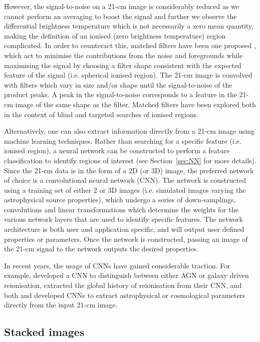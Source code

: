 However, the signal-to-noise on a 21-cm image is considerably reduced as we cannot perform an averaging to boost the signal and further we observe the differential brightness temperature which is not necessarily a zero mean quantity, making the definition of an ionised (zero brightness temperature) region complicated. In order to counteract this, matched filters have been one proposed \cite{Datta:2007,Datta:2008,Datta:2012,Majumdar:2012,Malloy:2013,Datta:2016}, which act to minimise the contributions from the noise and foregrounds while maximising the signal by choosing a filter shape consistent with the expected feature of the signal (i.e. spherical ionised region). The 21-cm image is convolved with filters which vary in size and/or shape until the signal-to-noise of the product peaks. A peak in the signal-to-noise corresponds to a feature in the 21-cm image of the same shape as the filter. Matched filters have been explored both in the context of blind and targeted searches of ionised regions.

Alternatively, one can also extract information directly from a 21-cm image using machine learning techniques. Rather than searching for a specific feature (i.e. ionised region), a neural network can be constructed to perform a feature classification to identify regions of interest (see Section~\ref{sec:NN} for more details). Since the 21-cm data is in the form of a 2D (or 3D) image, the preferred network of choice is a convolutional neural network (CNN). The network is constructed using a training set of either 2 or 3D images (i.e. simulated images varying the astrophysical source properties), which undergo a series of down-samplings, convolutions and linear transformations which determine the weights for the various network layers that are used to identify specific features. The network architecture is both user and application specific, and will output user defined properties or parameters. Once the network is constructed, passing an image of the 21-cm signal to the network outputs the desired properties.

In recent years, the usage of CNNs have gained considerable traction. For example, \cite{Hassan:2019a} developed a CNN to distinguish between either AGN or galaxy driven reionisation, \cite{LaPlante:2018} extracted the global history of reionisation from their CNN, and both \cite{Hassan:2019b} and \cite{Gillet:2019} developed CNNs to extract astrophysical or cosmological parameters directly from the input 21-cm image.

\subsection{Stacked images}

